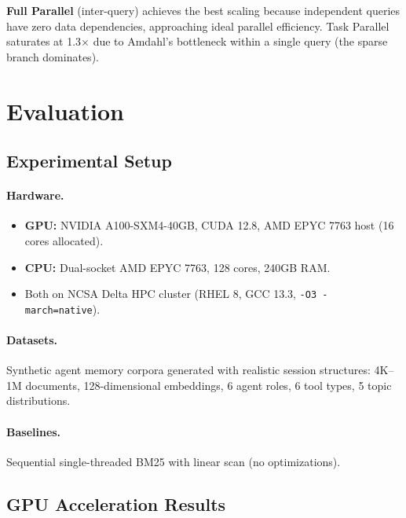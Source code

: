 \documentclass[sigconf,nonacm,anonymous]{acmart}
\newcommand{\speedup}[1]{#1$\times$}
\begin{document}
\textbf{Full Parallel} (inter-query) achieves the best scaling because
independent queries have zero data dependencies, approaching ideal
parallel efficiency.  Task Parallel saturates at \speedup{1.3} due to
Amdahl's bottleneck within a single query (the sparse branch dominates).

\section{Evaluation}
\label{sec:eval}

\subsection{Experimental Setup}

\paragraph{Hardware.}
\begin{itemize}
\item \textbf{GPU:} NVIDIA A100-SXM4-40GB, CUDA 12.8, AMD EPYC 7763 host (16 cores allocated).
\item \textbf{CPU:} Dual-socket AMD EPYC 7763, 128 cores, 240GB RAM.
\item Both on NCSA Delta HPC cluster (RHEL 8, GCC 13.3, \texttt{-O3 -march=native}).
\end{itemize}

\paragraph{Datasets.}
Synthetic agent memory corpora generated with realistic session
structures: 4K--1M documents, 128-dimensional embeddings, 6 agent
roles, 6 tool types, 5 topic distributions.

\paragraph{Baselines.}
Sequential single-threaded BM25 with linear scan (no optimizations).

\subsection{GPU Acceleration Results}
\end{document}
